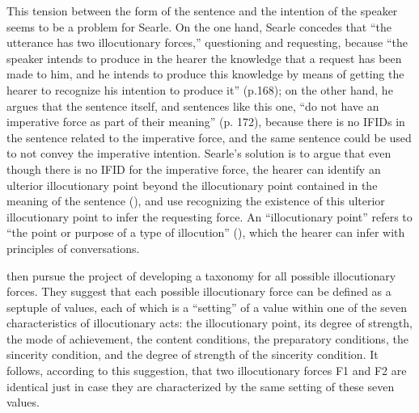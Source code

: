 This tension between the form of the sentence and the intention of the speaker seems to be a problem for Searle. On the one hand, Searle concedes that ``the utterance has two illocutionary forces,'' questioning and requesting, because ``the speaker intends to produce in the hearer the knowledge that a request has been made to him, and he intends to produce this knowledge by means of getting the hearer to recognize his intention to produce it'' (p.168); on the other hand, he argues that the sentence itself, and sentences like this one, ``do not have an imperative force as part of their meaning'' (p. 172), because there is no IFIDs in the sentence related to the imperative force, and the same sentence could be used to not convey the imperative intention. Searle's solution is to argue that even though there is no IFID for the imperative force, the hearer can identify an ulterior illocutionary point beyond the illocutionary point contained in the meaning of the sentence (\cite{searle1975indirect}), and use recognizing the existence of this ulterior illocutionary point to infer the requesting force. An ``illocutionary point'' refers to ``the point or purpose of a type of illocution'' (\cite{searle1975tax}), which the hearer can infer with principles of conversations.   

\textcite{searlevanderveken1985} then pursue the project of developing a taxonomy for all possible illocutionary forces. They suggest that each possible illocutionary force can be defined as a septuple of values, each of which is a ``setting'' of a value within one of the seven characteristics of illocutionary acts: the illocutionary point, its degree of strength, the mode of achievement, the content conditions, the preparatory conditions, the sincerity condition, and the degree of strength of the sincerity condition. It follows, according to this suggestion, that two illocutionary forces F1 and F2 are identical just in case they are characterized by the same setting of these seven values. 

